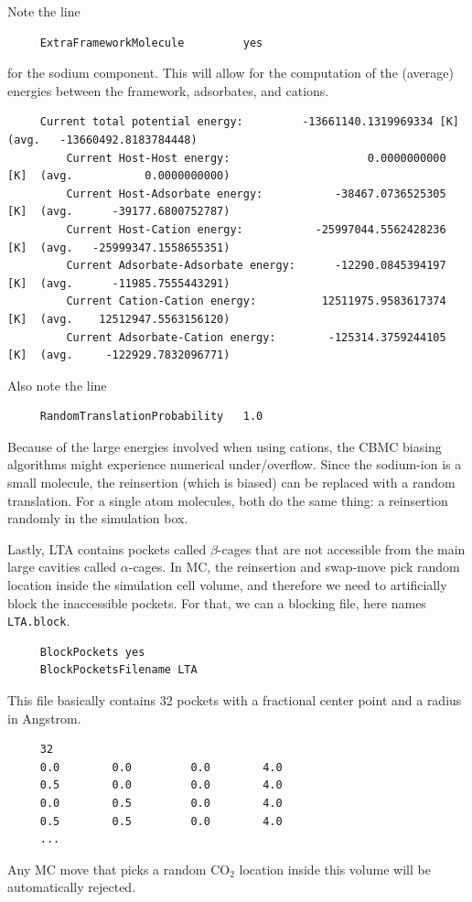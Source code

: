 \noindent
Note the line
\begin{tiny}
\begin{verbatim}
     ExtraFrameworkMolecule         yes
\end{verbatim}
\end{tiny}
for the sodium component. This will allow for the computation of the (average) energies between the framework, adsorbates, and cations.
\begin{tiny}
\begin{verbatim}
     Current total potential energy:         -13661140.1319969334 [K]  (avg.   -13660492.8183784448)
         Current Host-Host energy:                     0.0000000000 [K]  (avg.           0.0000000000)
         Current Host-Adsorbate energy:           -38467.0736525305 [K]  (avg.      -39177.6800752787)
         Current Host-Cation energy:           -25997044.5562428236 [K]  (avg.   -25999347.1558655351)
         Current Adsorbate-Adsorbate energy:      -12290.0845394197 [K]  (avg.      -11985.7555443291)
         Current Cation-Cation energy:          12511975.9583617374 [K]  (avg.    12512947.5563156120)
         Current Adsorbate-Cation energy:        -125314.3759244105 [K]  (avg.     -122929.7832096771)
\end{verbatim}
\end{tiny}
Also note the line
\begin{tiny}
\begin{verbatim}
     RandomTranslationProbability   1.0
\end{verbatim}
\end{tiny}
Because of the large energies involved when using cations, the CBMC biasing algorithms might experience numerical under/overflow.
Since the sodium-ion is a small molecule, the reinsertion (which is biased) can be replaced with a random translation.
For a single atom molecules, both do the same thing: a reinsertion randomly in the simulation box.

\noindent
Lastly, LTA contains pockets called $\beta$-cages that are not accessible from the main large cavities called $\alpha$-cages.
In MC, the reinsertion and swap-move pick random location inside the simulation cell volume, and therefore we need to artificially block
the inaccessible pockets. For that, we can a blocking file, here names \verb+LTA.block+.
\begin{tiny}
\begin{verbatim}
     BlockPockets yes 
     BlockPocketsFilename LTA
\end{verbatim}
This file basically contains 32 pockets with a fractional center point and a radius in Angstrom.
\end{tiny}
\begin{tiny}
\begin{verbatim}
     32
     0.0        0.0         0.0        4.0
     0.5        0.0         0.0        4.0
     0.0        0.5         0.0        4.0
     0.5        0.5         0.0        4.0
     ...
\end{verbatim}
\end{tiny}
Any MC move that picks a random CO$_2$ location inside this volume will be automatically rejected.

